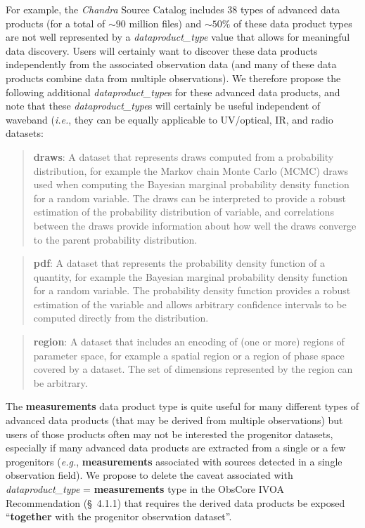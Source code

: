 \documentclass[11pt,a4paper]{ivoa}
\begin{document}
For example, the {\em Chandra\/} Source Catalog includes 38 types of advanced data products  (for a total of $\sim\!90$ million files) and $\sim\!50\%$ of these data product types are not well represented by a {\em dataproduct\_type} value that allows for meaningful data discovery.  Users will certainly want to discover these data products independently from the associated observation data (and many of these data products combine data from multiple observations).  We therefore propose the following additional {\em dataproduct\_type}s for these advanced data products, and note that these {\em dataproduct\_type}s will certainly be useful independent of waveband ({\em i.e.\/}, they can be equally applicable to UV/optical, IR, and radio datasets:

\begin{quote}
{\bf draws}:  A dataset that represents draws computed from a probability distribution, for example the Markov chain Monte Carlo (MCMC) draws used when computing the Bayesian marginal probability density function for a random variable.  The draws can be interpreted to provide a robust estimation of the probability distribution of variable, and correlations between the draws provide information about how well the draws converge to the parent probability distribution.
\end{quote}

\begin{quote}
{\bf pdf}: A dataset that represents the probability density function of a quantity, for example the Bayesian marginal probability density function for a random variable.  The probability density function provides a robust estimation of the variable and allows arbitrary confidence intervals to be computed directly from the distribution.
\end{quote}

\begin{quote}
{\bf region}: A dataset that includes an encoding of (one or more) regions of parameter space, for example a spatial region or a region of phase space covered by a dataset.  The set of dimensions represented by the region can be arbitrary.
\end{quote}

The {\bf measurements} data product type is quite useful for many different types of advanced data products (that may be derived from multiple observations) but users of those products often may not be interested the progenitor datasets, especially if many advanced data products are extracted from a single or a few progenitors ({\em e.g.\/}, {\bf measurements} associated with sources detected in a single observation field).  We propose to delete the caveat associated with {\em dataproduct\_type\/} = {\bf measurements} type in the ObsCore IVOA Recommendation (\S~4.1.1) that requires the derived data products be exposed ``{\bf together} with the progenitor observation dataset''.
\end{document}
